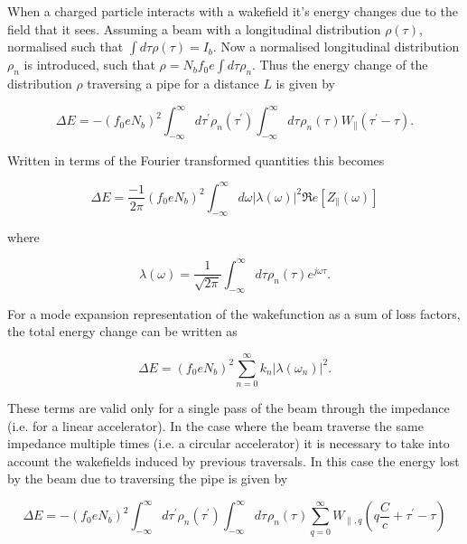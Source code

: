 \documentclass[12pt,a4paper,twopage,openright]{report}
\begin{document}
When a charged particle interacts with a wakefield it's energy changes due to the field that it sees. Assuming a beam with a longitudinal distribution $\rho (\tau)$, normalised such that $\int d \tau \rho (\tau ) = I_{b}$. Now a normalised longitudinal distribution $\rho_{n}$ is introduced, such that $\rho = N_{b} f_{0} e \int d \tau \rho_{n}$. Thus the energy change of the distribution $\rho$ traversing a pipe for a distance $L$ is given by \cite{Chao:PhysColEff, Ng:IntDepInstab}

\begin{equation}
\Delta E = - \left( f_{0} e N_{b}\right)^{2} \int^{\infty}_{-\infty} d\tau^{'} \rho_{n} \left( \tau^{'} \right) \int^{\infty}_{-\infty} d\tau^{} \rho_{n} \left( \tau^{} \right) W_{\parallel} \left( \tau^{'} - \tau \right).  
\end{equation}

Written in terms of the Fourier transformed quantities this becomes

\begin{equation}
\Delta E = \frac{-1}{2\pi}\left( f_{0} e N_{b}\right)^{2} \int^{\infty}_{-\infty} d\omega \left| \lambda \left( \omega \right)  \right|^{2} \Re{}e \left[ Z_{\parallel} \left( \omega \right) \right]
\end{equation}

where 

\begin{equation}
\lambda \left( \omega \right) = \frac{1}{\sqrt{2 \pi}}\int^{\infty}_{-\infty} d \tau \rho_{n} \left( \tau \right) e^{j\omega \tau}. 
\end{equation}

For a mode expansion representation of the wakefunction as a sum of loss factors, the total energy change can be written as 

\begin{equation}
\Delta E = \left( f_{0} e N_{b}\right)^{2} \displaystyle\sum\limits_{n = 0}^{\infty} k_{n} \left| \lambda \left( \omega_{n} \right)  \right|^{2}.
\end{equation}

These terms are valid only for a single pass of the beam through the impedance (i.e. for a linear accelerator). In the case where the beam traverse the same impedance multiple times (i.e. a circular accelerator) it is necessary to take into account the wakefields induced by previous traversals. In this case the energy lost by the beam due to traversing the pipe is given by

\begin{equation}
\Delta E = - \left( f_{0} e N_{b}\right)^{2} \int^{\infty}_{-\infty} d\tau^{'} \rho_{n} \left( \tau^{'} \right) \int^{\infty}_{-\infty} d\tau^{} \rho_{n} \left( \tau^{} \right) \displaystyle\sum\limits_{q = 0}^{\infty} W_{\parallel, q} \left( q\frac{C}{c} + \tau^{'} - \tau \right)  
\label{eqn:sum_wake_loss}
\end{equation}
\end{document}
